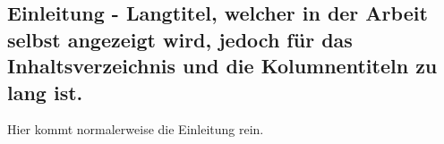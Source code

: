 \begin{showIntro}%
%
\chapter[Einleitung - Kurztitel für das Inhaltsverzeichnis und die Kolumnentitel]{Einleitung - Langtitel, welcher in der Arbeit selbst angezeigt wird, jedoch für das Inhaltsverzeichnis und die Kolumnentiteln zu lang ist.}%
\label{chap:Introduction}
%
Hier kommt normalerweise die Einleitung rein.
%
%
%
\end{showIntro}%
